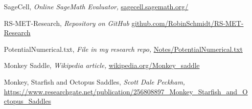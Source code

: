 \documentclass[12pt]{article}
\begin{document}

\begin{thebibliography}{9}
	
 SageCell, \textit{Online SageMath Evaluator,}
\href{https://sagecell.sagemath.org/}{sagecell.sagemath.org/}

 RS-MET-Research, \textit{Repository on GitHub}
\href{https://github.com/RobinSchmidt/RS-MET-Research}{github.com/RobinSchmidt/RS-MET-Research}

 PotentialNumerical.txt, \textit{File in my research repo,}
\href{https://github.com/RobinSchmidt/RS-MET-Research/blob/master/Notes/PotentialNumerical.txt}{Notes/PotentialNumerical.txt}

 Monkey Saddle, \textit{Wikipedia article,}
\href{https://wikipedia.org/wiki/Monkey_saddle}{wikipedia.org/Monkey\_saddle}

 Monkey, Starfish and Octopus Saddles, \textit{Scott Dale Peckham,}
\href{https://www.researchgate.net/publication/256808897_Monkey_Starfish_and_Octopus_Saddles	}{https://www.researchgate.net/publication/256808897\_Monkey\_Starfish\_and\_Octopus\_Saddles}


\end{thebibliography}
 
 
\end{document}
